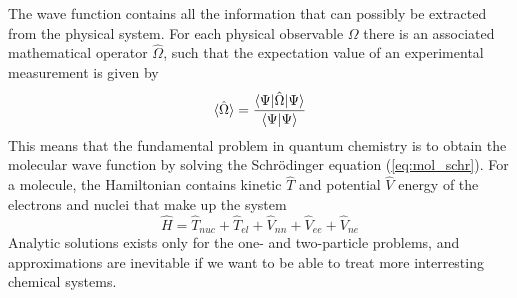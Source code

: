 The wave function contains all the information that can possibly be extracted from the 
physical system. For each physical observable $\Omega$ there is an associated mathematical 
operator $\hat{\Omega}$, such that the expectation value of an experimental measurement is 
given by
\begin{equation}
    \langle \hat{\Omega}\rangle = \frac{\langle\Psi|\hat{\Omega}|\Psi\rangle}
    {\langle\Psi|\Psi\rangle}
\end{equation}
This means that the fundamental problem in quantum chemistry is to obtain the molecular
wave function by solving the Schr\"{o}dinger equation (\ref{eq:mol_schr}). For a molecule,
the Hamiltonian contains kinetic $\hat{T}$ and potential $\hat{V}$ energy of the 
electrons and nuclei that make up the system
\begin{equation}
    \hat{H} = \hat{T}_{nuc} + \hat{T}_{el} + \hat{V}_{nn} + \hat{V}_{ee} + \hat{V}_{ne}
\end{equation}
Analytic solutions exists only for the one- and two-particle problems, and approximations 
are inevitable if we want to be able to treat more interresting chemical systems. 

